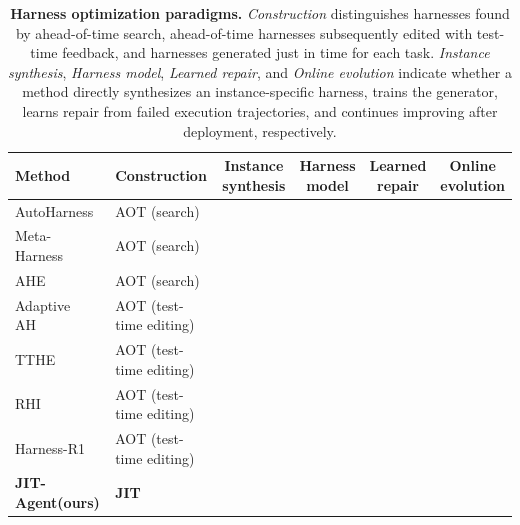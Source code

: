 \documentclass{article}
\newcommand{\cmark}{\textcolor{goodgreen}{\ding{51}}}
\newcommand{\xmark}{\textcolor{badred}{\ding{55}}}
\newcommand{\ourmethod}{JIT-Agent\xspace}
\begin{document}
\begin{table}[!h]
\centering
\caption{\small \textbf{Harness optimization paradigms.} \emph{Construction} distinguishes harnesses found by ahead-of-time search, ahead-of-time harnesses subsequently edited with test-time feedback, and harnesses generated just in time for each task. \emph{Instance synthesis}, \emph{Harness model}, \emph{Learned repair}, and \emph{Online evolution} indicate whether a method directly synthesizes an instance-specific harness, trains the generator, learns repair from failed execution trajectories, and continues improving after deployment, respectively.}
\label{tab:harness_optimization_comparison}
\footnotesize
\setlength{\tabcolsep}{3pt}
\renewcommand{\arraystretch}{0.9}
\begin{tabular}{@{}>{\RaggedRight\arraybackslash}p{} >{\centering\arraybackslash}p{} *{4}{c}@{}}
\toprule
Method & Construction & \shortstack{Instance\\synthesis} & \shortstack{Harness\\model} & \shortstack{Learned\\repair} & \shortstack{Online\\evolution} \\
\midrule
AutoHarness~\citep{lou2026autoharness} & AOT (search) & \xmark & \xmark & \xmark & \xmark \\
Meta-Harness~\citep{lee2026metaharnessendtoendoptimizationmodel} & AOT (search) & \xmark & \xmark & \xmark & \xmark \\
AHE~\citep{lin2026agenticharnessengineeringobservabilitydriven} & AOT (search) & \xmark & \xmark & \xmark & \xmark \\
Adaptive AH~\citep{liu2026adaptiveautoharness} & AOT (test-time editing) & \xmark & \xmark & \xmark & \cmark \\
TTHE~\citep{nie2026tthe} & AOT (test-time editing) & \xmark & \xmark & \xmark & \cmark \\
RHI~\citep{lee2026recursiveharness} & AOT (test-time editing) & \xmark & \xmark & \xmark & \cmark \\
Harness-R1~\citep{shao2026harnessr1} & AOT (test-time editing) & \xmark & \cmark & \cmark & \cmark \\
\midrule
\textbf{\ourmethod (ours)} & \textbf{JIT} & \cmark & \cmark & \cmark & \cmark \\
\bottomrule
\end{tabular}
\end{table}

\vspace{-0.5em}
\end{document}
